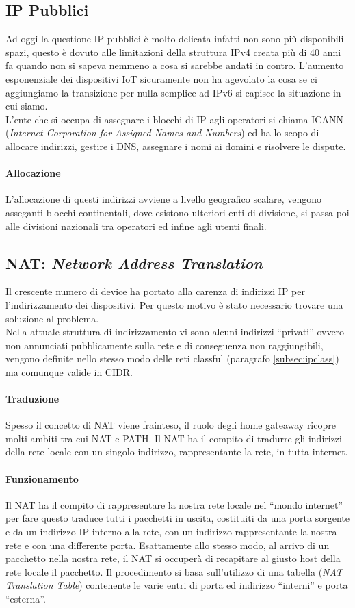 \documentclass[12pt]{article}
\begin{document}
\subsection{IP Pubblici}
Ad oggi la questione IP pubblici è molto delicata infatti non sono più disponibili spazi, questo è dovuto alle limitazioni della struttura IPv4 creata più di 40 anni fa quando non si sapeva nemmeno a cosa si sarebbe andati in contro. L'aumento esponenziale dei dispositivi IoT sicuramente non ha agevolato la cosa se ci aggiungiamo la transizione per nulla semplice ad IPv6 si capisce la situazione in cui siamo.\\
L'ente che si occupa di assegnare i blocchi di IP agli operatori si chiama ICANN (\textit{Internet Corporation for Assigned Names and Numbers}) ed ha lo scopo di allocare indirizzi, gestire i DNS, assegnare i nomi ai domini e risolvere le dispute.

\paragraph{Allocazione} L'allocazione di questi indirizzi avviene a livello geografico scalare, vengono asseganti blocchi continentali, dove esistono ulteriori enti di divisione, si passa poi alle divisioni nazionali tra operatori ed infine agli utenti finali.

\subsection{NAT: \textit{Network Address Translation}} %
Il crescente numero di device ha portato alla carenza di indirizzi IP per l'indirizzamento dei dispositivi. Per questo motivo è stato necessario trovare una soluzione al problema.\\
Nella attuale struttura di indirizzamento vi sono alcuni indirizzi ``privati'' ovvero non annunciati pubblicamente sulla rete e di conseguenza non raggiungibili, vengono definite nello stesso modo delle reti classful (paragrafo \ref{subsec:ipclass}) ma comunque valide in CIDR.
\paragraph{Traduzione} Spesso il concetto di NAT viene frainteso, il ruolo degli home gateaway ricopre molti ambiti tra cui NAT e PATH. Il NAT ha il compito di tradurre gli indirizzi della rete locale con un singolo indirizzo, rappresentante la rete, in tutta internet.
\paragraph{Funzionamento} Il NAT ha il compito di rappresentare la nostra rete locale nel ``mondo internet'' per fare questo traduce tutti i pacchetti in uscita, costituiti da una porta sorgente e da un indirizzo IP interno alla rete, con un indirizzo rappresentante la nostra rete e con una differente porta. Esattamente allo stesso modo, al arrivo di un pacchetto nella nostra rete, il NAT si occuperà di recapitare al giusto host della rete locale il pacchetto. Il procedimento si basa sull'utilizzo di una tabella (\textit{NAT Translation Table}) contenente le varie entri di porta ed indirizzo ``interni'' e porta ``esterna''.
\end{document}
